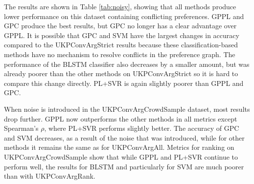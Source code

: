 The results are shown in Table \ref{tab:noisy}, showing that all methods produce lower performance on this dataset
containing conflicting preferences. GPPL and GPC produce the best results, 
but GPC no longer has a clear advantage over GPPL. It is possible that GPC and SVM have the
largest changes in accuracy compared to the UKPConvArgStrict results because these classification-based methods
have no mechanism to resolve conflicts in the preference graph. The performance of the BLSTM classifier also 
decreases by a smaller amount, but was already poorer than the other methods on UKPConvArgStrict so it is hard to 
compare this change directly. PL+SVR is again slightly poorer than GPPL and GPC.

When noise is introduced in the UKPConvArgCrowdSample dataset, most results drop further. 
GPPL now outperforms the other methods in all metrics except Spearman's $\rho$, where PL+SVR performs slightly better. 
The accuracy of GPC and SVM decreases, as a result of the noise that was introduced,
while for other methods it remains the same as for UKPConvArgAll. 
Metrics for ranking on UKPConvArgCrowdSample show that while GPPL and PL+SVR continue to perform well, the 
results for BLSTM and particularly for SVM are much poorer than with UKPConvArgRank. 


